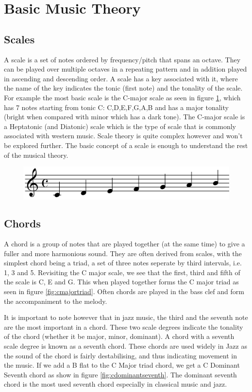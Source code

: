 \documentclass[pdftex,12pt,a4paper]{report}
\begin{document}
\section{Basic Music Theory}
\subsection{Scales}
A scale is a set of notes ordered by frequency/pitch that spans an octave. They can be played over multiple octaves in a repeating pattern and in addition played in ascending and descending order. A scale has a key associated with it, where the name of the key indicates the tonic (first note) and the tonality of the scale. For example the most basic scale is the C-major scale as seen in figure \ref{fig:cmajorscale}, which has 7 notes starting from tonic C: C,D,E,F,G,A,B and has a major tonality (bright when compared with minor which has a dark tone). The C-major scale is a Heptatonic (and Diatonic) scale which is the type of scale that is commonly associated with western music. Scale theory is quite complex however and won't be explored further. The basic concept of a scale is enough to understand the rest of the musical theory.

\begin{figure}[here]
  \centering
  \includegraphics[scale=0.6]{figure/cmajorscale.png}
  \label{fig:cmajorscale}
\end{figure}

\subsection{Chords}
A chord is a group of notes that are played together (at the same time) to give a fuller and more harmonious sound. They are often derived from scales, with the simplest chord being a triad, a set of three notes seperate by third intervals, i.e. 1, 3 and 5. Revisiting the C major scale, we see that the first, third and fifth of the scale is C, E and G. This when played together forms the C major triad as seen in figure \ref{fig:cmajortriad}. Often chords are played in the bass clef and form the accompaniment to the melody. 

It is important to note however that in jazz music, the third and the seventh note are the most important in a chord. These two scale degrees indicate the tonality of the chord (whether it be major, minor, dominant). A chord with a seventh scale degree is known as a seventh chord. These chords are used widely in Jazz as the sound of the chord is fairly destabilising, and thus indicating movement in the music. If we add a B flat to the C Major triad chord, we get a C Dominant Seventh chord as show in figure \ref{fig:cdominantseventh}. The dominant seventh chord is the most used seventh chord especially in classical music and jazz.
\end{document}
